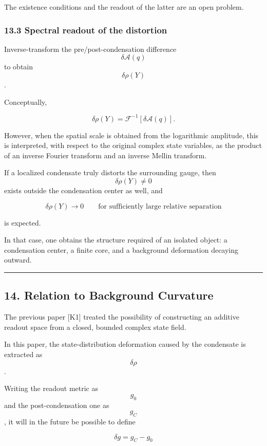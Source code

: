 \documentclass[
  a4paper,
]{article}
\begin{document}
The existence conditions and the readout of the latter are an open
problem.

\subsubsection{13.3 Spectral readout of the
distortion}\label{spectral-readout-of-the-distortion}

Inverse-transform the pre/post-condensation difference
\[\delta\mathcal A(q)\] to obtain \[\delta\rho(Y)\].

Conceptually,

\[
\delta\rho(Y)
=
\mathcal F^{-1}
\left[
\delta\mathcal A(q)
\right].
\tag{40}
\]

However, when the spatial scale is obtained from the logarithmic
amplitude, this is interpreted, with respect to the original complex
state variables, as the product of an inverse Fourier transform and an
inverse Mellin transform.

If a localized condensate truly distorts the surrounding gauge, then
\[\delta\rho(Y)\neq0\] exists outside the condensation center as well,
and

\[
\delta\rho(Y)
\to0
\qquad
\text{for sufficiently large relative separation}
\tag{41}
\]

is expected.

In that case, one obtains the structure required of an isolated object:
a condensation center, a finite core, and a background deformation
decaying outward.

\begin{center}\rule{0.5\linewidth}{0.5pt}\end{center}

\subsection{14. Relation to Background
Curvature}\label{relation-to-background-curvature}

The previous paper {[}K1{]} treated the possibility of constructing an
additive readout space from a closed, bounded complex state field.

In this paper, the state-distribution deformation caused by the
condensate is extracted as \[\delta\rho\].

Writing the readout metric as \[g_0\] and the post-condensation one as
\[g_C\], it will in the future be possible to define

\[
\boxed{
\delta g
=
g_C-g_0
}
\tag{42}
\]
\end{document}
